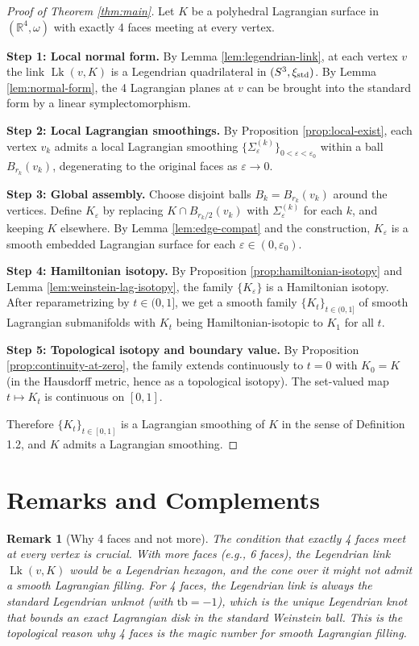 \documentclass[12pt]{article}
\DeclareMathOperator{\Lk}{Lk}
\newtheorem{remark}[theorem]{Remark}
\newcommand{\bR}{\mathbb{R}}
\newcommand{\eps}{\varepsilon}
\newcommand{\om}{\omega}
\begin{document}
\begin{proof}[Proof of Theorem \ref{thm:main}]
Let $K$ be a polyhedral Lagrangian surface in $(\bR^4, \om)$ with exactly 4 faces meeting at every vertex.

\textbf{Step 1: Local normal form.} By Lemma \ref{lem:legendrian-link}, at each vertex $v$ the link $\Lk(v,K)$ is a Legendrian quadrilateral in $(S^3, \xi_{\rm std})$. By Lemma \ref{lem:normal-form}, the 4 Lagrangian planes at $v$ can be brought into the standard form by a linear symplectomorphism.

\textbf{Step 2: Local Lagrangian smoothings.} By Proposition \ref{prop:local-exist}, each vertex $v_k$ admits a local Lagrangian smoothing $\{\Sigma_\eps^{(k)}\}_{0<\eps<\eps_0}$ within a ball $B_{r_k}(v_k)$, degenerating to the original faces as $\eps\to 0$.

\textbf{Step 3: Global assembly.} Choose disjoint balls $B_k = B_{r_k}(v_k)$ around the vertices. Define $K_\eps$ by replacing $K \cap B_{r_k/2}(v_k)$ with $\Sigma_\eps^{(k)}$ for each $k$, and keeping $K$ elsewhere. By Lemma \ref{lem:edge-compat} and the construction, $K_\eps$ is a smooth embedded Lagrangian surface for each $\eps \in (0, \eps_0)$.

\textbf{Step 4: Hamiltonian isotopy.} By Proposition \ref{prop:hamiltonian-isotopy} and Lemma \ref{lem:weinstein-lag-isotopy}, the family $\{K_\eps\}$ is a Hamiltonian isotopy. After reparametrizing by $t \in (0,1]$, we get a smooth family $\{K_t\}_{t \in (0,1]}$ of smooth Lagrangian submanifolds with $K_t$ being Hamiltonian-isotopic to $K_1$ for all $t$.

\textbf{Step 5: Topological isotopy and boundary value.} By Proposition \ref{prop:continuity-at-zero}, the family extends continuously to $t = 0$ with $K_0 = K$ (in the Hausdorff metric, hence as a topological isotopy). The set-valued map $t \mapsto K_t$ is continuous on $[0,1]$.

Therefore $\{K_t\}_{t \in [0,1]}$ is a Lagrangian smoothing of $K$ in the sense of Definition 1.2, and $K$ admits a Lagrangian smoothing.
\end{proof}

\section{Remarks and Complements}

\begin{remark}[Why 4 faces and not more]
The condition that exactly 4 faces meet at every vertex is crucial. With more faces (e.g., 6 faces), the Legendrian link $\Lk(v,K)$ would be a Legendrian hexagon, and the cone over it might not admit a smooth Lagrangian filling. For 4 faces, the Legendrian link is always the standard Legendrian unknot (with $\mathrm{tb} = -1$), which is the unique Legendrian knot that bounds an exact Lagrangian disk in the standard Weinstein ball. This is the topological reason why 4 faces is the magic number for smooth Lagrangian filling.
\end{remark}
\end{document}
